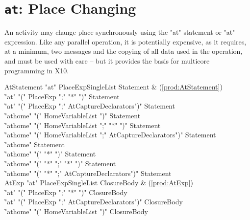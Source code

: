 \section{ {\tt at}: Place Changing}\label{AtStatement}

An activity may change place synchronously using the \xcd"at" statement or
\xcd"at" expression. Like any parallel operation, it is 
potentially expensive, as it requires, at a minimum, two messages
and the copying of all data used in the operation, and must be used with care
-- but it provides the basis for multicore programming in X10.

\begin{bbgrammar}
         AtStatement \: \xcd"at" PlaceExpSingleList Statement & (\ref{prod:AtStatement}) \\
                    \| \xcd"at" \xcd"(" PlaceExp \xcd";" \xcd"*" \xcd")" Statement \\
                    \| \xcd"at" \xcd"(" PlaceExp \xcd";" AtCaptureDeclarators\opt \xcd")" Statement \\
                    \| \xcd"athome" \xcd"(" HomeVariableList \xcd")" Statement \\
                    \| \xcd"athome" \xcd"(" HomeVariableList \xcd";" \xcd"*" \xcd")" Statement \\
                    \| \xcd"athome" \xcd"(" HomeVariableList \xcd";" AtCaptureDeclarators\opt \xcd")" Statement \\
                    \| \xcd"athome" Statement \\
                    \| \xcd"athome" \xcd"(" \xcd"*" \xcd")" Statement \\
                    \| \xcd"athome" \xcd"(" \xcd"*" \xcd";" \xcd"*" \xcd")" Statement \\
                    \| \xcd"athome" \xcd"(" \xcd"*" \xcd";" AtCaptureDeclarators\opt \xcd")" Statement \\
               AtExp \: \xcd"at" PlaceExpSingleList ClosureBody & (\ref{prod:AtExp}) \\
                    \| \xcd"at" \xcd"(" PlaceExp \xcd";" \xcd"*" \xcd")" ClosureBody \\
                    \| \xcd"at" \xcd"(" PlaceExp \xcd";" AtCaptureDeclarators\opt \xcd")" ClosureBody \\
                    \| \xcd"athome" \xcd"(" HomeVariableList \xcd")" ClosureBody \\

\end{bbgrammar}
